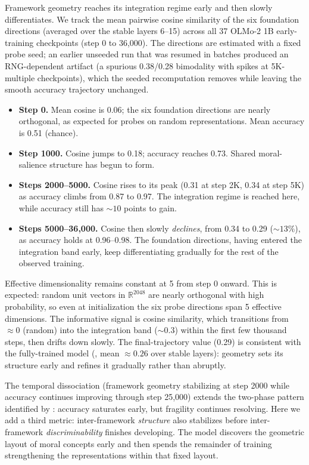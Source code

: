 Framework geometry reaches its integration regime early and then
slowly differentiates. We track the mean pairwise cosine similarity of
the six foundation directions (averaged over the stable layers 6--15)
across all 37 OLMo-2 1B early-training checkpoints (step 0 to 36,000).
The directions are estimated with a fixed probe seed; an earlier
unseeded run that was resumed in batches produced an RNG-dependent
artifact (a spurious 0.38/0.28 bimodality with spikes at 5K-multiple
checkpoints), which the seeded recomputation removes while leaving the
smooth accuracy trajectory unchanged.

\begin{itemize}
\item
  \textbf{Step 0.} Mean cosine is 0.06; the six foundation directions are
  nearly orthogonal, as expected for probes on random representations.
  Mean accuracy is 0.51 (chance).
\item
  \textbf{Step 1000.} Cosine jumps to 0.18; accuracy reaches 0.73. Shared
  moral-salience structure has begun to form.
\item
  \textbf{Steps 2000--5000.} Cosine rises to its peak (0.31 at step 2K,
  0.34 at step 5K) as accuracy climbs from 0.87 to 0.97. The
  integration regime is reached here, while accuracy still has \({\sim}10\)
  points to gain.
\item
  \textbf{Steps 5000--36,000.} Cosine then slowly \emph{declines}, from 0.34 to
  0.29 (\({\sim}13\%\)), as accuracy holds at 0.96--0.98. The foundation
  directions, having entered the integration band early, keep
  differentiating gradually for the rest of the observed training.
\end{itemize}

Effective dimensionality remains constant at 5 from step 0 onward.
This is expected: random unit vectors in \(\mathbb{R}^{2048}\) are
nearly orthogonal with high probability, so even at initialization
the six probe directions span 5 effective dimensions. The informative
signal is cosine similarity, which transitions from \(\approx 0\)
(random) into the integration band (\({\sim}0.3\)) within the first few
thousand steps, then drifts down slowly. The final-trajectory value
(0.29) is consistent with the fully-trained model (, mean
\({\approx}0.26\) over stable layers): geometry sets its structure early
and refines it gradually rather than abruptly.

The temporal dissociation (framework geometry stabilizing at step
2000 while accuracy continues improving through step 25,000)
extends the two-phase pattern identified by
\citet{reblitzrichardson2026fragility}: accuracy saturates early, but
fragility continues resolving. Here we add a third metric:
inter-framework \emph{structure} also stabilizes before inter-framework
\emph{discriminability} finishes developing. The model discovers the
geometric layout of moral concepts early and then spends the
remainder of training strengthening the representations within that
fixed layout.

